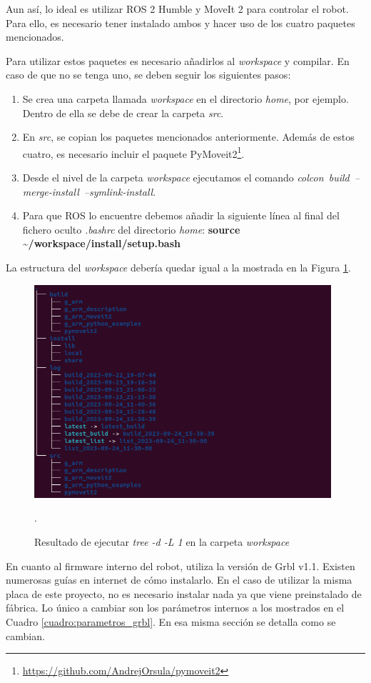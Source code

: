 Aun así, lo ideal es utilizar ROS 2 Humble y MoveIt 2 para controlar el robot. Para ello, es necesario tener instalado 
ambos y hacer uso de los cuatro paquetes mencionados.

\newpage
Para utilizar estos paquetes es necesario añadirlos al \textit{workspace} y compilar. En caso de que no se tenga uno, 
se deben seguir los siguientes pasos: 
\begin{enumerate}
\item Se crea una carpeta llamada \textit{workspace} en el directorio \textit{home}, por ejemplo. Dentro de ella 
se debe de crear la carpeta \textit{src}. 
\item En \textit{src}, se copian los paquetes mencionados anteriormente. Además de estos cuatro, es necesario incluir el paquete 
PyMoveit2\footnote{\url{https://github.com/AndrejOrsula/pymoveit2}}.
\item Desde el nivel de la carpeta \textit{workspace} ejecutamos el comando \mbox{\textit{colcon build --merge-install --symlink-install}}.
\item Para que ROS lo encuentre debemos añadir la siguiente línea al final del fichero oculto \textit{.bashrc} del directorio \textit{home}:
\textbf{source \textasciitilde/workspace/install/setup.bash}

\end{enumerate}

La estructura del \textit{workspace} debería quedar igual a la mostrada en la Figura \ref{fig:ws_tree}.
\begin{figure} [ht!]
    \begin{center}
        \includegraphics[width=11cm]{figs/ws_tree.png}
    \end{center}
    \caption{Resultado de ejecutar \textit{tree -d -L 1} en la carpeta \textit{workspace}}.
\label{fig:ws_tree}
\end{figure}

En cuanto al firmware interno del robot, utiliza la versión de Grbl v1.1. Existen numerosas guías en internet de 
cómo instalarlo. En el caso de utilizar la misma placa de este proyecto, no es necesario instalar nada ya que viene preinstalado de fábrica. Lo único 
a cambiar son los parámetros internos a los mostrados en el Cuadro \ref{cuadro:parametros_grbl}. En esa misma sección se detalla como se cambian.

